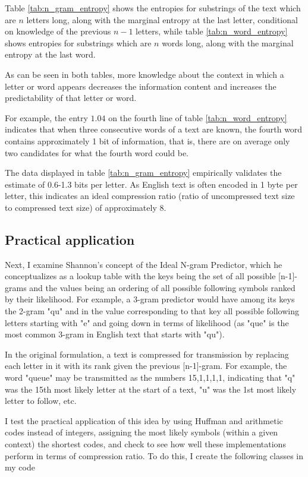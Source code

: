 Table \ref{tab:n_gram_entropy} shows the entropies for substrings of the text which are $n$ letters long, along with the marginal entropy at the last letter, conditional on knowledge of the previous $n-1$ letters, while table \ref{tab:n_word_entropy} shows entropies for substrings which are $n$ words long, along with the marginal entropy at the last word.

As can be seen in both tables, more knowledge about the context in which a letter or word appears decreases the information content and increases the predictability of that letter or word.

For example, the entry $1.04$ on the fourth line of table \ref{tab:n_word_entropy} indicates that when three consecutive words of a text are known, the fourth word contains approximately 1 bit of information, that is, there are on average only two candidates for what the fourth word could be.

The data displayed in table \ref{tab:n_gram_entropy} empirically validates the estimate of 0.6-1.3 bits per letter. As English text is often encoded in 1 byte per letter, this indicates an ideal compression ratio (ratio of uncompressed text size to compressed text size) of approximately 8.


\subsection{Practical application}

Next, I examine Shannon's concept of the Ideal N-gram Predictor, which he conceptualizes as a lookup table with the keys being the set of all possible [n-1]-grams and the values being an ordering of all possible following symbols ranked by their likelihood. For example, a 3-gram predictor would have among its keys the 2-gram "qu" and in the value corresponding to that key all possible following letters starting with "e" and going down in terms of likelihood (as "que" is the most common 3-gram in English text that starts with "qu").

In the original formulation, a text is compressed for transmission by replacing each letter in it with its rank given the previous [n-1]-gram. For example, the word "queue" may be transmitted as the numbers 15,1,1,1,1, indicating that "q" was the 15th most likely letter at the start of a text, "u" was the 1st most likely letter to follow, etc.

I test the practical application of this idea by using Huffman and arithmetic codes instead of integers, assigning the most likely symbols (within a given context) the shortest codes, and check to see how well these implementations perform in terms of compression ratio. To do this, I create the following classes in my code

